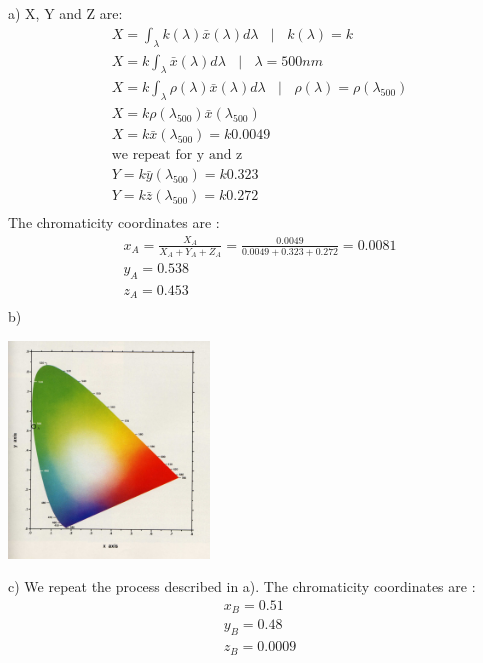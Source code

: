 \documentclass{article}
\begin{document}
\section{}
a) X, Y and Z are:
\begin{gather}  
X = \int_\lambda k(\lambda) \bar{x}(\lambda) d{\lambda} \text{  }\ | \text{  }\ k({\lambda}) = k\\ 
X = k \int_\lambda \bar{x}(\lambda) d{\lambda} \text{  }\ | \text{  }\ {\lambda} = 500nm\\
X = k \int_\lambda \rho(\lambda) \bar{x}(\lambda) d{\lambda} \text{  }\ | \text{  }\ \rho(\lambda) = \rho(\lambda_{500})  \\ 
X = k \rho(\lambda_{500}) \bar{x}(\lambda_{500}) \\
X = k \bar{x}(\lambda_{500}) = k 0.0049 \\
\text{we repeat for y and z}\ \\
Y = k \bar{y}(\lambda_{500}) = k 0.323 \\
Y = k \bar{z}(\lambda_{500}) = k 0.272\\ 
\end{gather}
The chromaticity coordinates are :
\begin{gather}  
x_{A} = \frac{X_{A}}{X_{A}+Y_{A}+Z_{A}} = \frac{0.0049}{0.0049+0.323+0.272} = 0.0081 \\
y_{A} = 0.538 \\
z_{A} = 0.453 \\
\end{gather}
b)
\begin{center}
\includegraphics[width=0.4\textwidth]{2b.jpg} 
\end{center}
c) We repeat the process described in a). The chromaticity coordinates are :
\begin{gather} 
x_{B} = 0.51 \\
y_{B} = 0.48 \\
z_{B} = 0.0009 \\
\end{gather}
\end{document}
